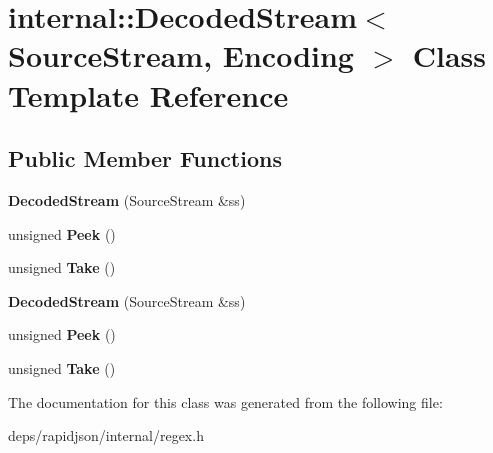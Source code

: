 \hypertarget{classinternal_1_1_decoded_stream}{}\section{internal\+:\+:Decoded\+Stream$<$ Source\+Stream, Encoding $>$ Class Template Reference}
\label{classinternal_1_1_decoded_stream}
\subsection*{Public Member Functions}
\begin{DoxyCompactItemize}
\item 
{\bfseries Decoded\+Stream} (Source\+Stream \&ss)\hypertarget{classinternal_1_1_decoded_stream_a45cf40c4e515be8aaa8cd020eaa67595}{}\label{classinternal_1_1_decoded_stream_a45cf40c4e515be8aaa8cd020eaa67595}

\item 
unsigned {\bfseries Peek} ()\hypertarget{classinternal_1_1_decoded_stream_ac78f2cbc03ae0d79a0fcfe6d56589d70}{}\label{classinternal_1_1_decoded_stream_ac78f2cbc03ae0d79a0fcfe6d56589d70}

\item 
unsigned {\bfseries Take} ()\hypertarget{classinternal_1_1_decoded_stream_a62b45969ce169bef1da0600490329857}{}\label{classinternal_1_1_decoded_stream_a62b45969ce169bef1da0600490329857}

\item 
{\bfseries Decoded\+Stream} (Source\+Stream \&ss)\hypertarget{classinternal_1_1_decoded_stream_a45cf40c4e515be8aaa8cd020eaa67595}{}\label{classinternal_1_1_decoded_stream_a45cf40c4e515be8aaa8cd020eaa67595}

\item 
unsigned {\bfseries Peek} ()\hypertarget{classinternal_1_1_decoded_stream_ac78f2cbc03ae0d79a0fcfe6d56589d70}{}\label{classinternal_1_1_decoded_stream_ac78f2cbc03ae0d79a0fcfe6d56589d70}

\item 
unsigned {\bfseries Take} ()\hypertarget{classinternal_1_1_decoded_stream_a62b45969ce169bef1da0600490329857}{}\label{classinternal_1_1_decoded_stream_a62b45969ce169bef1da0600490329857}

\end{DoxyCompactItemize}


The documentation for this class was generated from the following file\+:\begin{DoxyCompactItemize}
\item 
deps/rapidjson/internal/regex.\+h\end{DoxyCompactItemize}
